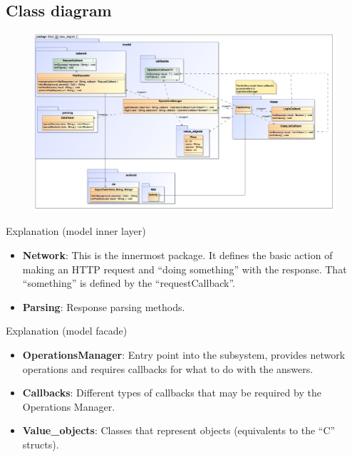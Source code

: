 \documentclass{beamer}
\begin{document}
\subsection{Class diagram}
\begin{frame}
\begin{figure}
\begin{center}
\includegraphics[scale=0.33]{../observer-pattern/diagrams/class_diagram}
\end{center}
\end{figure}
\end{frame}

\begin{frame}{Explanation (model inner layer)}
\begin{itemize}
\item {\bf Network}: This is the innermost package. It defines the basic action of making an HTTP request and ``doing something'' with the response. That ``something'' is defined by the ``requestCallback''.
\item {\bf Parsing}: Response parsing methods.
\end{itemize} 
\end{frame}

\begin{frame}{Explanation (model facade)}
\begin{itemize}
\item {\bf OperationsManager}: Entry point into the subsystem, provides network operations and requires callbacks for what to do with the answers.
\item {\bf Callbacks}: Different types of callbacks that may be required by the Operations Manager.
\item {\bf Value\_objects}: Classes that represent objects (equivalents to the ``C'' structs).
\end{itemize} 
\end{frame}
\end{document}
